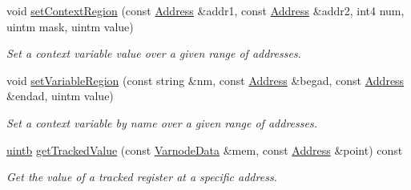 \begin{DoxyCompactItemize}
void \mbox{\hyperlink{class_context_database_adce04fedb87fa51a7511963bdffdd591}{set\+Context\+Region}} (const \mbox{\hyperlink{class_address}{Address}} \&addr1, const \mbox{\hyperlink{class_address}{Address}} \&addr2, int4 num, uintm mask, uintm value)
\begin{DoxyCompactList}\small\item\em Set a context variable value over a given range of addresses. \end{DoxyCompactList}\item 
void \mbox{\hyperlink{class_context_database_a567fd374a19fcb9a85ac96e4f2fea27e}{set\+Variable\+Region}} (const string \&nm, const \mbox{\hyperlink{class_address}{Address}} \&begad, const \mbox{\hyperlink{class_address}{Address}} \&endad, uintm value)
\begin{DoxyCompactList}\small\item\em Set a context variable by name over a given range of addresses. \end{DoxyCompactList}\item 
\mbox{\hyperlink{types_8h_a2db313c5d32a12b01d26ac9b3bca178f}{uintb}} \mbox{\hyperlink{class_context_database_a4e4ffd9c15465a2503ddc38a54caab61}{get\+Tracked\+Value}} (const \mbox{\hyperlink{struct_varnode_data}{Varnode\+Data}} \&mem, const \mbox{\hyperlink{class_address}{Address}} \&point) const
\begin{DoxyCompactList}\small\item\em Get the value of a tracked register at a specific address. \end{DoxyCompactList}\end{DoxyCompactItemize}

